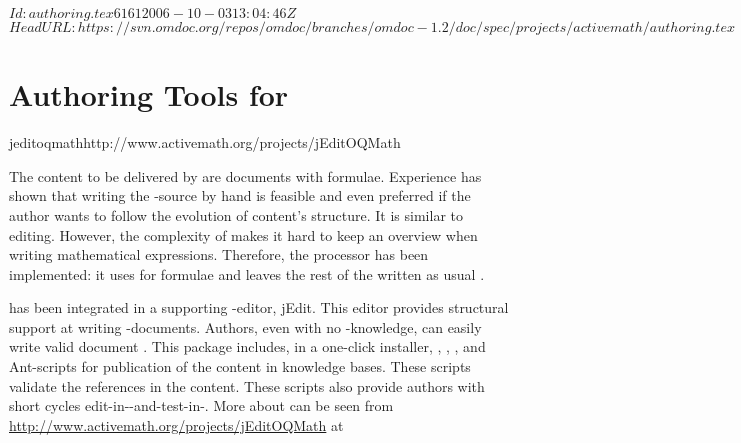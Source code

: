 \svnInfo $Id: authoring.tex 6161 2006-10-03 13:04:46Z  $
\svnKeyword $HeadURL: https://svn.omdoc.org/repos/omdoc/branches/omdoc-1.2/doc/spec/projects/activemath/authoring.tex $

\section{Authoring Tools for {\activemath}}
\begin{project}{jeditoqmath}{http://www.activemath.org/projects/jEditOQMath}
\end{project}


The {\omdoc} content to be delivered by {\activemath} are {\omdoc} documents with
{\openmath} formulae. Experience has shown that writing the {\xml}-source by hand is
feasible and even preferred if the author wants to follow the evolution of content's
structure.  It is similar to {\html} editing.  However, the complexity of {\xml} makes it
hard to keep an overview when writing mathematical expressions. Therefore, the
{} processor has been implemented: it uses {} for formulae and
leaves the rest of the {\omdoc} written as usual {\xml}.

{} has been integrated in a supporting {\xml}-editor, jEdit. This editor
provides structural support at writing {\xml}-documents. Authors, even with no
{\xml}-knowledge, can easily write valid document {}.  This package
includes, in a one-click installer, {\qmath}, {}, {}, and
Ant-scripts for publication of the content in {\activemath} knowledge bases.  These
scripts validate the references in the content.  These scripts also provide authors with
short cycles edit-in-{}-and-test-in-{\activemath}.  More about
{} can be seen from
{\url{http://www.activemath.org/projects/jEditOQMath}} at~\cite{AM-authoring-from-dev-on}


